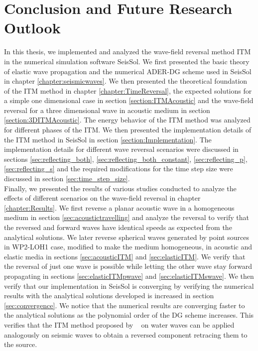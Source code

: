 \chapter{Conclusion and Future Research Outlook}\label{chapter:Conclusion}
In this thesis, we implemented and analyzed the wave-field reversal method \ac{ITM} in the numerical simulation software SeisSol. We first presented the basic theory of elastic wave propagation and the numerical \ac{ADER}-\ac{DG} scheme used in SeisSol in chapter \ref{chapter:seismicwaves}.
We then presented the theoretical foundation of the \ac{ITM} method in chapter \ref{chapter:TimeReversal}, the expected solutions for a simple one dimensional case in section \ref{section:ITMAcoustic} and the wave-field reversal for a three dimensional wave in acoustic medium in section \ref{section:3DITMAcoustic}.
The energy behavior of the \ac{ITM} method was analyzed for different phases of the \ac{ITM}.
We then presented the implementation details of the \ac{ITM} method in SeisSol in section \ref{section:Implementation}. The implementation details 
for different wave reversal scenarios were discussed in sections \ref{sec:reflecting_both}, \ref{sec:reflecting_both_constant}, \ref{sec:reflecting_p}, \ref{sec:reflecting_s} and the required modifications for the time step size were discussed in section \ref{sec:time_step_size}. \\

Finally, we presented the results of various studies conducted to analyze the effects of different scenarios on the wave-field reversal in chapter \ref{chapter:Results}.
We first reverse a planar acoustic wave in a homogeneous medium in section \ref{sec:acoustictravelling} and analyze the reversal to verify that the reversed and forward waves have identical speeds as expected from the analytical solutions.
We later reverse spherical waves generated by point sources in WP2-LOH1 case, modified to make the medium homogeneous, in acoustic and elastic media in sections \ref{sec:acousticITM} and \ref{sec:elasticITM}. We verify that the reversal of just one wave is possible while letting 
the other wave stay forward propagating in sections \ref{sec:elasticITMpwave} and \ref{sec:elasticITMswave}. We then verify that our implementation in SeisSol is converging by verifying the numerical results with the analytical solutions developed is increased in section \ref{sec:convergence}. We notice that
the numerical results are converging faster to the analytical solutions as the polynomial order of the \ac{DG} scheme increases. This verifies that the \ac{ITM}
method proposed by ~\parencite{Bacot2016} on water waves can be applied analogously on seismic waves to obtain a reversed component retracing them to the source. \\

